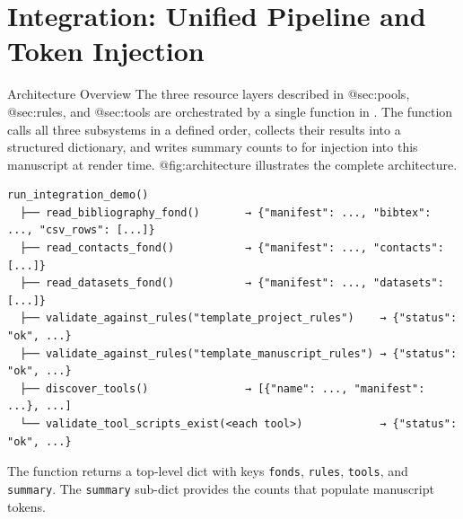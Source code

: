 \documentclass[
  ignorenonframetext,
]{beamer}
\author{\texorpdfstring{}{}}
\date{}
\begin{document}
\section{Integration: Unified Pipeline and Token
Injection}\label{sec:integration}

\begin{frame}{Architecture Overview}
\protect{}\label{architecture-overview}
The three resource layers described in @sec:pools, @sec:rules, and
@sec:tools are orchestrated by a single function in
. The 
function calls all three subsystems in a defined order, collects their
results into a structured dictionary, and writes summary counts to
 for injection into this
manuscript at render time. @fig:architecture illustrates the complete
architecture.

\begin{verbatim}
run_integration_demo()
  ├── read_bibliography_fond()       → {"manifest": ..., "bibtex": ..., "csv_rows": [...]}
  ├── read_contacts_fond()           → {"manifest": ..., "contacts": [...]}
  ├── read_datasets_fond()           → {"manifest": ..., "datasets": [...]}
  ├── validate_against_rules("template_project_rules")    → {"status": "ok", ...}
  ├── validate_against_rules("template_manuscript_rules") → {"status": "ok", ...}
  ├── discover_tools()               → [{"name": ..., "manifest": ...}, ...]
  └── validate_tool_scripts_exist(<each tool>)            → {"status": "ok", ...}
\end{verbatim}

The function returns a top-level dict with keys \texttt{fonds},
\texttt{rules}, \texttt{tools}, and \texttt{summary}. The
\texttt{summary} sub-dict provides the counts that populate manuscript
tokens.
\end{frame}
\end{document}
